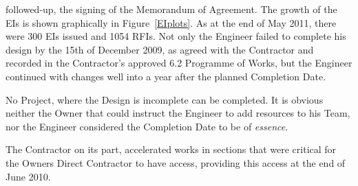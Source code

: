 
 followed-up, the signing of the Memorandum of Agreement. The growth of the EIs is shown graphically in Figure~\ref{EIplots}. As at the end of May 2011, there were 300 EIs issued and 1054 RFIs.
Not only the Engineer failed to complete his design by the 15th of December 2009, as agreed with the Contractor and recorded in the Contractor's approved 6.2 Programme of Works, but the Engineer continued with changes well into a year after the planned Completion Date.


\def\monthnames{{"D","J","F","M","A","M","J","J","A","S","O","N","D"}}
\pgfplotsset{width=16cm}

\begin{fullwidth}
\begin{figure*}[htbp]
\caption{Plots showing the growth of Engineer's Instructions and their relationship to Requests for Information, the relationship can be observed clearly. See for example the \textit{bumps} at around April-May 2010.}
\label{EIplots}
\end{figure*}
\end{fullwidth}

No Project, where the Design is incomplete can be completed. It is obvious neither the Owner that could instruct the Engineer to add resources to his Team, nor the Engineer considered the Completion Date to be of \textit{essence}.

The Contractor on its part, accelerated works in sections that were critical for the Owners Direct Contractor to have access, providing this access at the end of June 2010.
